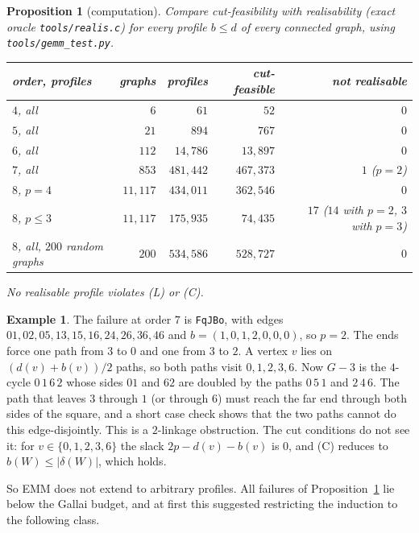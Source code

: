 \documentclass[11pt]{amsart}
\newtheorem{proposition}[theorem]{Proposition}
\theoremstyle{definition}
\newtheorem{example}[theorem]{Example}
\begin{document}
\begin{proposition}[computation]\label{prop:gemm}
Compare cut-feasibility with realisability (exact oracle \texttt{tools/realis.c}) for every profile
$b\le d$ of every connected graph, using \texttt{tools/gemm\_test.py}.
\begin{center}
\begin{tabular}{lrrrr}
\toprule
order, profiles & graphs & profiles & cut-feasible & not realisable\\
\midrule
$4$, all & $6$ & $61$ & $52$ & $0$\\
$5$, all & $21$ & $894$ & $767$ & $0$\\
$6$, all & $112$ & $14{,}786$ & $13{,}897$ & $0$\\
$7$, all & $853$ & $481{,}442$ & $467{,}373$ & $1$ ($p=2$)\\
$8$, $p=4$ & $11{,}117$ & $434{,}011$ & $362{,}546$ & $0$\\
$8$, $p\le3$ & $11{,}117$ & $175{,}935$ & $74{,}435$ & $17$ ($14$ with $p=2$, $3$ with $p=3$)\\
$8$, all, $200$ random graphs & $200$ & $534{,}586$ & $528{,}727$ & $0$\\
\bottomrule
\end{tabular}
\end{center}
No realisable profile violates (L) or (C).
\end{proposition}

\begin{example}\label{ex:linkage}
The failure at order $7$ is \texttt{FqJBo}, with edges $01,02,05,13,15,16,24,26,36,46$ and
$b=(1,0,1,2,0,0,0)$, so $p=2$. The ends force one path from $3$ to $0$ and one from $3$ to $2$.
A vertex $v$ lies on $(d(v)+b(v))/2$ paths, so both paths visit $0,1,2,3,6$. Now $G-3$ is the
$4$-cycle $0\,1\,6\,2$ whose sides $01$ and $62$ are doubled by the paths $0\,5\,1$ and $2\,4\,6$.
The path that leaves $3$ through $1$ (or through $6$) must reach the far end through both sides of
the square, and a short case check shows that the two paths cannot do this edge-disjointly. This
is a $2$-linkage obstruction. The cut conditions do not see it: for $v\in\{0,1,2,3,6\}$ the slack
$2p-d(v)-b(v)$ is $0$, and (C) reduces to $b(W)\le|\delta(W)|$, which holds.
\end{example}

So EMM does not extend to arbitrary profiles. All failures of Proposition~\ref{prop:gemm} lie
below the Gallai budget, and at first this suggested restricting the induction to the following
class.
\end{document}
